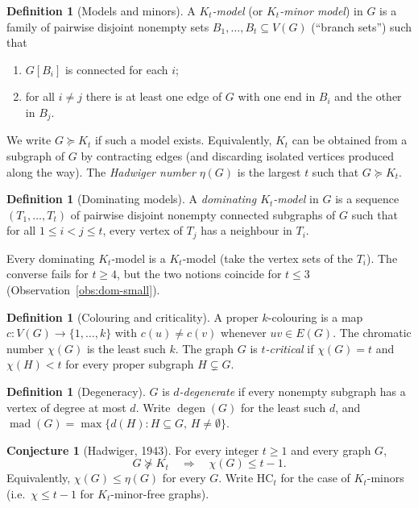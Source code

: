 \documentclass[11pt]{article}
\theoremstyle{definition}
\newtheorem{definition}[theorem]{Definition}
\newtheorem{conjecture}[theorem]{Conjecture}
\newcommand{\degen}{\operatorname{degen}}
\newcommand{\mad}{\operatorname{mad}}
\newcommand{\had}{\eta}
\begin{document}
\begin{definition}[Models and minors]
A \emph{\(K_t\)-model} (or \emph{\(K_t\)-minor model}) in \(G\) is a family of
pairwise disjoint nonempty sets \(B_1,\dots,B_t\subseteq V(G)\) (``branch
sets'') such that
\begin{enumerate}
\item \(G[B_i]\) is connected for each \(i\);
\item for all \(i\neq j\) there is at least one edge of \(G\) with one end in
\(B_i\) and the other in \(B_j\).
\end{enumerate}
We write \(G\succcurlyeq K_t\) if such a model exists. Equivalently, \(K_t\) can
be obtained from a subgraph of \(G\) by contracting edges (and discarding
isolated vertices produced along the way). The \emph{Hadwiger number}
\(\had(G)\) is the largest \(t\) such that \(G\succcurlyeq K_t\).
\end{definition}

\begin{definition}[Dominating models]
A \emph{dominating \(K_t\)-model} in \(G\) is a sequence \((T_1,\dots,T_t)\) of
pairwise disjoint nonempty connected subgraphs of \(G\) such that for all
\(1\le i<j\le t\), every vertex of \(T_j\) has a neighbour in \(T_i\).
\end{definition}

Every dominating \(K_t\)-model is a \(K_t\)-model (take the vertex sets of the
\(T_i\)). The converse fails for \(t\ge 4\), but the two notions coincide for
\(t\le 3\) (Observation~\ref{obs:dom-small}).

\begin{definition}[Colouring and criticality]
A proper \(k\)-colouring is a map \(c:V(G)\to\{1,\dots,k\}\) with \(c(u)\neq c(v)\)
whenever \(uv\in E(G)\). The chromatic number \(\chi(G)\) is the least such \(k\).
The graph \(G\) is \emph{\(t\)-critical} if \(\chi(G)=t\) and \(\chi(H)<t\) for
every proper subgraph \(H\subsetneq G\).
\end{definition}

\begin{definition}[Degeneracy]
\(G\) is \emph{\(d\)-degenerate} if every nonempty subgraph has a vertex of
degree at most \(d\). Write \(\degen(G)\) for the least such \(d\), and
\(\mad(G)=\max\{d(H):H\subseteq G,\,H\neq\emptyset\}\).
\end{definition}

\begin{conjecture}[Hadwiger, 1943]
For every integer \(t\ge 1\) and every graph \(G\),
\[
G\not\succcurlyeq K_t \quad\Longrightarrow\quad \chi(G)\le t-1.
\]
Equivalently, \(\chi(G)\le\had(G)\) for every \(G\). Write \(\mathrm{HC}_t\) for
the case of \(K_t\)-minors (i.e.\ \(\chi\le t-1\) for \(K_t\)-minor-free graphs).
\end{conjecture}
\end{document}
